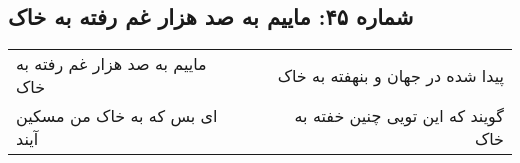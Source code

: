 \begin{center}
\section*{شماره ۴۵: ماییم به صد هزار غم رفته به خاک}
\label{sec:045}
\begin{longtable}{l p{0.5cm} r}
ماییم به صد هزار غم رفته به خاک
&&
پیدا شده در جهان و بنهفته به خاک
\\
ای بس که به خاک من مسکین آیند
&&
گویند که این تویی چنین خفته به خاک
\\
\end{longtable}
\end{center}

